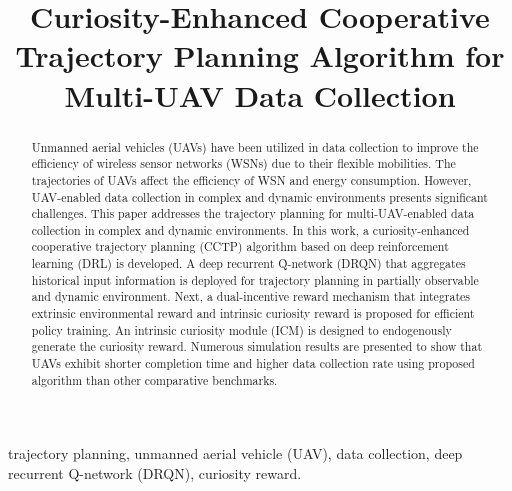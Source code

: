 \documentclass[conference]{IEEEtran}
\begin{document}
\title{Curiosity-Enhanced Cooperative Trajectory Planning Algorithm for Multi-UAV Data Collection\\
}

\author{
}

\maketitle

\begin{abstract}
Unmanned aerial vehicles (UAVs) have been utilized in data collection to improve the efficiency of wireless sensor networks (WSNs) due to their flexible mobilities. The trajectories of UAVs affect the efficiency of WSN and energy consumption. However, UAV-enabled data collection in complex and dynamic environments presents significant challenges. This paper addresses the trajectory planning for multi-UAV-enabled data collection in complex and dynamic environments. In this work, a curiosity-enhanced cooperative trajectory planning (CCTP) algorithm based on deep reinforcement learning (DRL) is developed. A deep recurrent Q-network (DRQN) that aggregates historical input information is deployed for trajectory planning in partially observable and dynamic environment. Next, a dual-incentive reward mechanism that integrates extrinsic environmental reward and intrinsic curiosity reward is proposed for efficient policy training. An intrinsic curiosity module (ICM) is designed to endogenously generate the curiosity reward. Numerous simulation results are presented to show that UAVs exhibit shorter completion time and higher data collection rate using proposed algorithm than other comparative benchmarks. 
\end{abstract}

\begin{IEEEkeywords}
trajectory planning, unmanned aerial vehicle (UAV), data collection, deep recurrent Q-network (DRQN), curiosity reward.
\end{IEEEkeywords}
\end{document}
